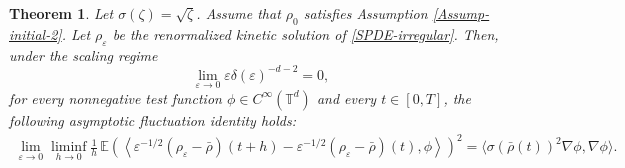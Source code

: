 \documentclass[UTF-8,reqno]{amsart}
\numberwithin{equation}{section}
\newtheorem{theorem}{Theorem}[section]
\begin{document}
\begin{theorem}\label{asymptotic-behavior}
Let $\sigma(\zeta)=\sqrt{\zeta}$. Assume that $\rho_0$ satisfies Assumption \ref{Assump-initial-2}. Let $\rho_{\varepsilon}$ be the renormalized kinetic solution of \eqref{SPDE-irregular}. Then, under the scaling regime $$\lim_{\varepsilon\rightarrow0}\varepsilon\delta(\varepsilon)^{-d-2}=0,$$ for every nonnegative test function $\phi \in C^{\infty}(\mathbb{T}^d)$ and every $t \in [0,T]$, the following asymptotic fluctuation identity holds:
\begin{align*}
	\lim_{\varepsilon \to 0} \liminf_{h \to 0} \frac{1}{h} \, \mathbb{E} \left( \left\langle \varepsilon^{-1/2}(\rho_{\varepsilon} - \bar{\rho})(t + h) - \varepsilon^{-1/2}(\rho_{\varepsilon} - \bar{\rho})(t), \phi \right\rangle \right)^2 = \langle \sigma(\bar{\rho}(t))^2 \nabla \phi, \nabla \phi \rangle.
\end{align*}
\end{theorem}
\end{document}
